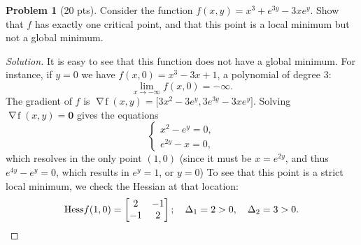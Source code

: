 \documentclass[12pt]{article}
\theoremstyle{definition}
\newtheorem{problem}{Problem}
\def\gradient#1{\mathop{\nabla\! {#1}}}
\def\Hess#1{\mathop{\mathrm{Hess}{#1}}}
\begin{document}
\bigskip
\begin{problem}[20 pts]
Consider the function $f(x,y)= x^3+e^{3y}-3xe^y$.  Show that $f$ has exactly one critical point, and that this point is a local minimum but not a global minimum.
\begin{proof}[Solution]
It is easy to see that this function does not have a global minimum.  For instance, if $y=0$ we have $f(x,0)=x^3-3x+1$, a polynomial of degree 3: 
\begin{equation*}
\lim_{x\to -\infty} f(x,0)= -\infty.
\end{equation*}
The gradient of $f$ is $\gradient{f}(x,y) = \big[ 3x^2-3e^y, 3e^{3y}-3xe^y \big]$.  Solving $\gradient{f}(x,y) = \boldsymbol{0}$ gives the equations
\begin{equation*}
\begin{cases}  x^2-e^y=0, \\ e^{2y}-x=0, \end{cases}
\end{equation*}
which resolves in the only point $(1,0)$ (since it must be $x=e^{2y}$, and thus $e^{4y}-e^y=0$, which results in $e^y=1$, or $y=0$)  To see that this point is a strict local minimum, we check the Hessian at that location:
\begin{equation*}
\Hess{f}(1,0) = \begin{bmatrix} 2 & -1 \\ -1 & 2 \end{bmatrix}; \quad \Delta_1 = 2 > 0, \quad \Delta_2 = 3 > 0. \qedhere
\end{equation*}
\end{proof}
\end{problem}
\end{document}
